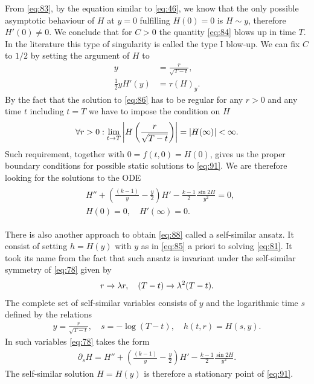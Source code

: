 From \eqref{eq:83}, by the equation similar to \eqref{eq:46}, we know
that the only possible asymptotic behaviour of $H$ at $y=0$ fulfilling
$H(0)=0$ is $H\sim y$, therefore $H'(0)\ne0$. We conclude that for
$C>0$ the quantity \eqref{eq:84} blows up in time $T$. In the
literature this type of singularity is called the type I blow-up.
We can fix $C$ to $1/2$ by setting the argument of $H$ to
\begin{align}
  \label{eq:85}
  y&=\frac{r}{\sqrt{T-t}},\\
  \label{eq:86}
  \frac{1}{2}yH'(y)&=\tau(H)_y.
\end{align}
By the fact that the solution to \eqref{eq:86} has to be regular for
any $r>0$ and any time $t$ including $t=T$ we have to impose the
condition on $H$
\begin{align}
  \label{eq:87}
  \forall{r>0}:\lim_{t\rightarrow T}
  \left|H\left(\frac{r}{\sqrt{T-t}}\right)\right|=\left|H(\infty)\right|<\infty.
\end{align}
Such requirement, together with $0=f(t,0)=H(0)$, gives us the proper
boundary conditions for possible static solutions to \eqref{eq:91}. We
are therefore looking for the solutions to the ODE
\begin{align}
  \label{eq:88}
  \begin{split}
    &H''+\left(\frac{(k-1)}{y}-\frac{y}{2}\right)H'-\frac{k-1}{2}\frac{\sin2H}{y^2}=0,\\
    &H(0)=0,\quad H'(\infty)=0.
  \end{split}
\end{align}

There is also another approach to obtain \eqref{eq:88} called a
self-similar ansatz. It consist of setting $h=H(y)$ with $y$ as in
\eqref{eq:85} a priori to solving \eqref{eq:81}. It took its name from
the fact that such ansatz is invariant under the self-similar symmetry
of \eqref{eq:78} given by
\begin{align}
  \label{eq:89}
  r\rightarrow\lambda r,\quad(T-t)\rightarrow\lambda^2(T-t).
\end{align}
The complete set of self-similar variables consists of $y$ and the
logarithmic time $s$ defined by the relations
\begin{align}
  \label{eq:90}
  y=\frac{r}{\sqrt{T-t}},\quad s=-\log(T-t),\quad h(t,r)=H(s,y).
\end{align}
In such variables \eqref{eq:78} takes the form
\begin{align}
  \label{eq:91}
  \partial_s
  H=H''+\left(\frac{(k-1)}{y}-\frac{y}{2}\right)H'-\frac{k-1}{2}\frac{\sin2H}{y^2}.
\end{align}
The self-similar solution $H=H(y)$ is therefore a stationary point of
\eqref{eq:91}.\\

